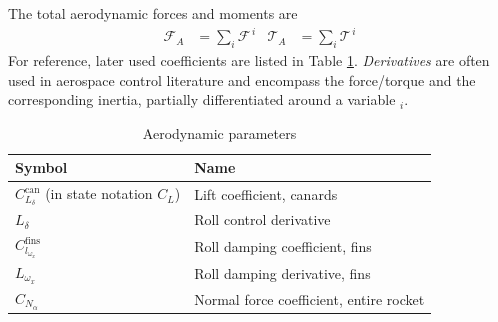 The total aerodynamic forces and moments are 
\begin{align}
    \mathcal{F}_A &= \sum_i \mathcal{F}^{\,i} 
    & 
    \mathcal{T}_A &= \sum_i \mathcal{T}^{\,i}
\end{align}
For reference, later used coefficients are listed in Table \ref{tab:aero-coeff}.
\textit{Derivatives} are often used in aerospace control literature and encompass the force/torque and the corresponding inertia, partially differentiated around a variable $_i$.

\begin{table}[ht]
\begin{center}
\begin{tabular}{l l}
Symbol & Name \\
\hline
$C^\text{can}_{L_\delta}$ (in state notation $C_L$) & Lift coefficient, canards \\
$L_\delta$ & Roll control derivative \\
$C^\text{fins}_{l_{\omega_x}}$ &  Roll damping coefficient, fins \\
$L_{\omega_x}$ & Roll damping derivative, fins \\
$C_{N_\alpha}$ & Normal force coefficient, entire rocket
\end{tabular}
\end{center}
\caption{Aerodynamic parameters} \label{tab:aero-coeff}
\end{table}

